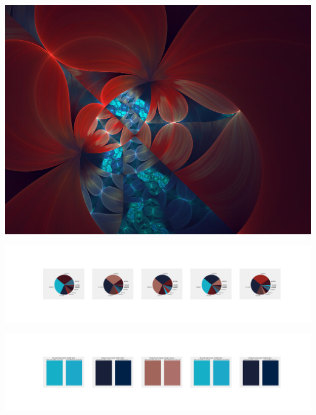 \documentclass[11pt]{article}
\begin{document}
\begin{landscape}
    \begin{center}
    \includegraphics[width=\textwidth]{./nbimg/file (220).jpg}
    \end{center}

    \begin{center}
    \includegraphics[width=250mm]{./nbimg/pie-135.jpg}
    \end{center}

    \begin{center}
    \includegraphics[width=250mm]{./nbimg/peak-135.jpg}
    \end{center}
    


\end{landscape}
\end{document}

